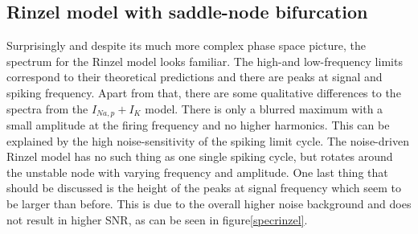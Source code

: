\documentclass[12pt,a4paper]{article}
\begin{document}
\subsection{Rinzel model with saddle-node bifurcation}
Surprisingly and despite its much more complex phase space picture, the spectrum for the Rinzel model looks familiar. The high-and low-frequency limits correspond to their theoretical predictions and there are peaks at signal and spiking frequency. Apart from that, there are some qualitative differences to the spectra from the $I_{Na,p}+I_K$ model. There is only a blurred maximum with a small amplitude at the firing frequency and no higher harmonics. This can be explained by the high noise-sensitivity of the spiking limit cycle. The noise-driven Rinzel model has no such thing as one single spiking cycle, but rotates around the unstable node with varying frequency and amplitude. One last thing that should be discussed is the height of the peaks at signal frequency which seem to be larger than before. This is due to the overall higher noise background and does not result in higher SNR, as can be seen in figure\ref{specrinzel}.
\end{document}
